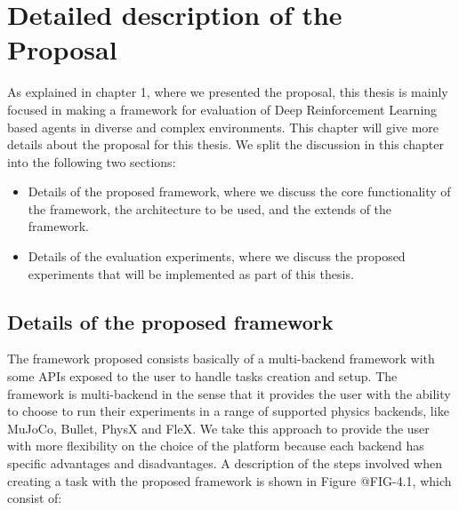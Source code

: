 
\chapter{Detailed description of the Proposal}
\label{ch:proposal}



As explained in chapter 1, where we presented the proposal, this thesis is mainly
focused in making a framework for evaluation of Deep Reinforcement Learning based agents
in diverse and complex environments. This chapter will give more details about the 
proposal for this thesis. We split the discussion in this chapter into the following two sections: 

\begin{itemize}
    \item Details of the proposed framework, where we discuss the core functionality 
          of the framework, the architecture to be used, and the extends of the framework.
    \item Details of the evaluation experiments, where we discuss the proposed experiments
          that will be implemented as part of this thesis.
\end{itemize}

\section{Details of the proposed framework}

The framework proposed consists basically of a multi-backend framework with some
APIs exposed to the user to handle tasks creation and setup. The framework is multi-backend
in the sense that it provides the user with the ability to choose to run their experiments
in a range of supported physics backends, like MuJoCo, Bullet, PhysX and FleX. We take
this approach to provide the user with more flexibility on the choice of the platform because
each backend has specific advantages and disadvantages. A description of the steps involved 
when creating a task with the proposed framework is shown in Figure @FIG-4.1, which consist of:

